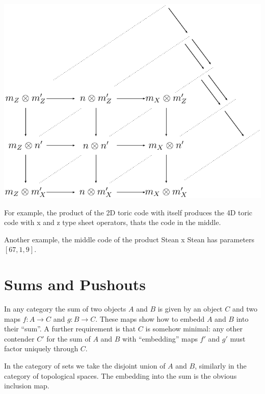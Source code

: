 \begin{center}
\includegraphics{prodqq.pdf}
\end{center}

For example, the product of the 2D toric code with itself
produces the 4D toric code with x and z type sheet operators,
thats the code in the middle.

Another example, the middle code of the product Stean x Stean has
parameters $[67, 1, 9].$



%
%
%


\section{Sums and Pushouts}

In any category the sum of two objects $A$ and $B$ is given by
an object $C$ and two maps $f:A\to C$ and $g:B\to C$. These
maps show how to embedd $A$ and $B$ into their ``sum''. A further
requirement is that $C$ is somehow minimal: any other contender
$C'$ for the sum of $A$ and $B$ with ``embedding'' maps $f'$ and $g'$
must factor uniquely through $C$.

In the category of sets we take the disjoint union of $A$ and $B$,
similarly in the category of topological spaces. The embedding
into the sum is the obvious inclusion map.

